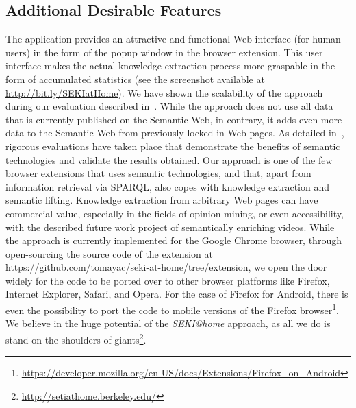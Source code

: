 \documentclass[runningheads,a4paper]{llncs}
\begin{document}
\subsection*{Additional Desirable Features}
The application provides an attractive and functional Web interface (for human users) in the form of the popup window in the browser extension.
This user interface makes the actual knowledge extraction process more graspable in the form of accumulated statistics
(see the screenshot available at \url{http://bit.ly/SEKIatHome}).
We have shown the scalability of the approach during our evaluation described in~\cite{Steiner2012SEKIatHome}.
While the approach does not use all data that is currently published on the Semantic Web, in contrary, it adds even more data to the Semantic Web
from previously locked-in Web pages.
As detailed in~\cite{Steiner2012SEKIatHome}, rigorous evaluations have taken place that demonstrate the benefits of semantic technologies and validate the results obtained.
Our approach is one of the few browser extensions that uses semantic technologies, and that, apart from information retrieval via SPARQL, also copes with knowledge extraction and semantic lifting.
Knowledge extraction from arbitrary Web pages can have commercial value,
especially in the fields of opinion mining, or even accessibility,
with the described future work project of semantically enriching videos.
While the approach is currently implemented for the Google Chrome browser,
through open-sourcing the source code of the extension at \url{https://github.com/tomayac/seki-at-home/tree/extension}, we open the door widely
for the code to be ported over to other browser platforms like Firefox, Internet Explorer, Safari, and Opera. For the case of Firefox for Android, there is even the possibility to port the code to mobile versions of the Firefox browser\footnote{\url{https://developer.mozilla.org/en-US/docs/Extensions/Firefox_on_Android}}.
We believe in the huge potential of the \emph{SEKI@home} approach,
as all we do is stand on the shoulders of giants\footnote{\url{http://setiathome.berkeley.edu/}}.
\end{document}
